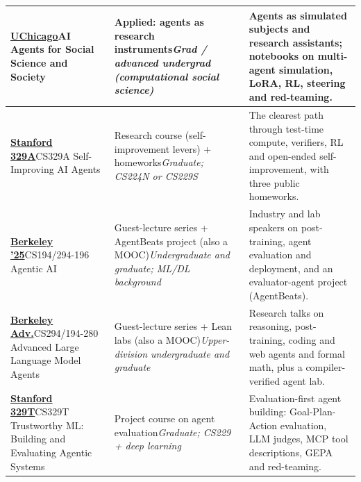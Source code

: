 \documentclass[10pt,oneside]{report}
\begin{document}
{\begin{longtable}{P{3.6cm} P{4.4cm} P{7.6cm}}
\hyperlink{course-UCHI}{\textbf{UChicago}}\newline AI Agents for Social Science and Society & Applied: agents as research instruments\newline\emph{Grad / advanced undergrad (computational social science)} & Agents as simulated subjects and research assistants; notebooks on multi-agent simulation, LoRA, RL, steering and red-teaming.\\ \midrule
\hyperlink{course-S329A}{\textbf{Stanford 329A}}\newline CS329A Self-Improving AI Agents & Research course (self-improvement levers) + homeworks\newline\emph{Graduate; CS224N or CS229S} & The clearest path through test-time compute, verifiers, RL and open-ended self-improvement, with three public homeworks.\\ \midrule
\hyperlink{course-BRKAG}{\textbf{Berkeley '25}}\newline CS194/294-196 Agentic AI & Guest-lecture series + AgentBeats project (also a MOOC)\newline\emph{Undergraduate and graduate; ML/DL background} & Industry and lab speakers on post-training, agent evaluation and deployment, and an evaluator-agent project (AgentBeats).\\ \midrule
\hyperlink{course-BRKADV}{\textbf{Berkeley Adv.}}\newline CS294/194-280 Advanced Large Language Model Agents & Guest-lecture series + Lean labs (also a MOOC)\newline\emph{Upper-division undergraduate and graduate} & Research talks on reasoning, post-training, coding and web agents and formal math, plus a compiler-verified agent lab.\\ \midrule
\hyperlink{course-S329T}{\textbf{Stanford 329T}}\newline CS329T Trustworthy ML: Building and Evaluating Agentic Systems & Project course on agent evaluation\newline\emph{Graduate; CS229 + deep learning} & Evaluation-first agent building: Goal-Plan-Action evaluation, LLM judges, MCP tool descriptions, GEPA and red-teaming.\\ \midrule
\end{longtable}}
\end{document}
